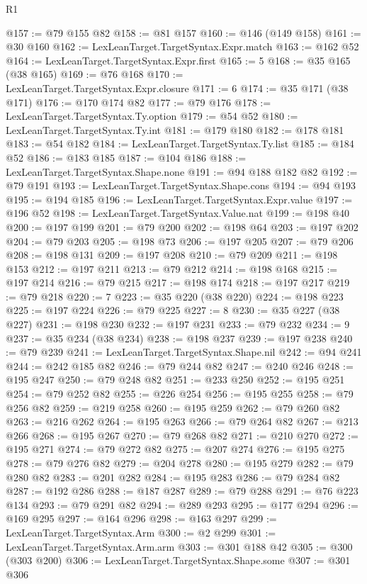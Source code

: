 \begin{lexlean}{R1}
\begin{coremodule}
{{{{{{{{{{{{{{{{{{{{{{{{{{{{{{{{{{{{{{{{{{{{{{{{{{@157 := @79 @155 @82
@158 := @81 @157
@160 := @146 (@149 @158)
@161 := @30 @160
@162 := LexLeanTarget.TargetSyntax.Expr.match
@163 := @162 @52
@164 := LexLeanTarget.TargetSyntax.Expr.first
@165 := 5
@168 := @35 @165 (@38 @165)
@169 := @76 @168
@170 := LexLeanTarget.TargetSyntax.Expr.closure
@171 := 6
@174 := @35 @171 (@38 @171)
@176 := @170 @174 @82
@177 := @79 @176
@178 := LexLeanTarget.TargetSyntax.Ty.option
@179 := @54 @52
@180 := LexLeanTarget.TargetSyntax.Ty.int
@181 := @179 @180
@182 := @178 @181
@183 := @54 @182
@184 := LexLeanTarget.TargetSyntax.Ty.list
@185 := @184 @52
@186 := @183 @185
@187 := @104 @186
@188 := LexLeanTarget.TargetSyntax.Shape.none
@191 := @94 @188 @182 @82
@192 := @79 @191
@193 := LexLeanTarget.TargetSyntax.Shape.cons
@194 := @94 @193
@195 := @194 @185
@196 := LexLeanTarget.TargetSyntax.Expr.value
@197 := @196 @52
@198 := LexLeanTarget.TargetSyntax.Value.nat
@199 := @198 @40
@200 := @197 @199
@201 := @79 @200
@202 := @198 @64
@203 := @197 @202
@204 := @79 @203
@205 := @198 @73
@206 := @197 @205
@207 := @79 @206
@208 := @198 @131
@209 := @197 @208
@210 := @79 @209
@211 := @198 @153
@212 := @197 @211
@213 := @79 @212
@214 := @198 @168
@215 := @197 @214
@216 := @79 @215
@217 := @198 @174
@218 := @197 @217
@219 := @79 @218
@220 := 7
@223 := @35 @220 (@38 @220)
@224 := @198 @223
@225 := @197 @224
@226 := @79 @225
@227 := 8
@230 := @35 @227 (@38 @227)
@231 := @198 @230
@232 := @197 @231
@233 := @79 @232
@234 := 9
@237 := @35 @234 (@38 @234)
@238 := @198 @237
@239 := @197 @238
@240 := @79 @239
@241 := LexLeanTarget.TargetSyntax.Shape.nil
@242 := @94 @241
@244 := @242 @185 @82
@246 := @79 @244 @82
@247 := @240 @246
@248 := @195 @247
@250 := @79 @248 @82
@251 := @233 @250
@252 := @195 @251
@254 := @79 @252 @82
@255 := @226 @254
@256 := @195 @255
@258 := @79 @256 @82
@259 := @219 @258
@260 := @195 @259
@262 := @79 @260 @82
@263 := @216 @262
@264 := @195 @263
@266 := @79 @264 @82
@267 := @213 @266
@268 := @195 @267
@270 := @79 @268 @82
@271 := @210 @270
@272 := @195 @271
@274 := @79 @272 @82
@275 := @207 @274
@276 := @195 @275
@278 := @79 @276 @82
@279 := @204 @278
@280 := @195 @279
@282 := @79 @280 @82
@283 := @201 @282
@284 := @195 @283
@286 := @79 @284 @82
@287 := @192 @286
@288 := @187 @287
@289 := @79 @288
@291 := @76 @223 @134
@293 := @79 @291 @82
@294 := @289 @293
@295 := @177 @294
@296 := @169 @295
@297 := @164 @296
@298 := @163 @297
@299 := LexLeanTarget.TargetSyntax.Arm
@300 := @2 @299
@301 := LexLeanTarget.TargetSyntax.Arm.arm
@303 := @301 @188 @42
@305 := @300 (@303 @200)
@306 := LexLeanTarget.TargetSyntax.Shape.some
@307 := @301 @306
}}}}}}}}}}}}}}}}}}}}}}}}}}}}}}}}}}}}}}}}}}}}}}}}}}
\end{coremodule}
\end{lexlean}
